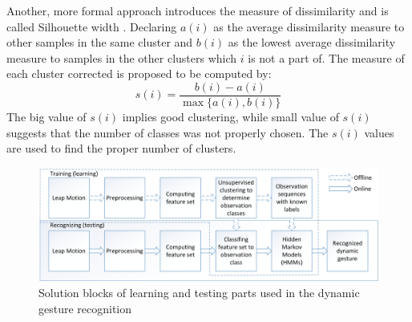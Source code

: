Another, more formal approach introduces the measure of dissimilarity and is called Silhouette width \cite{silhouette}.
Declaring $a(i)$ as the average dissimilarity measure to other samples in the same cluster and $b(i)$ as the lowest average dissimilarity measure to samples in the other clusters which $i$ is not a part of.
The measure of each cluster corrected is proposed to be computed by:
\begin{equation}
s(i) = \frac{b(i) - a(i)}{\max{\{a(i),b(i)}\}}
\end{equation}
The big value of $s(i)$ implies good clustering, while small value of $s(i)$ suggests that the number of classes was not properly chosen.
The $s(i)$ values are used to find the proper number of clusters.


\begin{figure}[htb]
\centering
 \includegraphics[width=1\columnwidth]{figures/DynamicGestures.png}
 \caption{Solution blocks of learning and testing parts used in the dynamic gesture recognition}
 \label{dynamicgesturesflow}
\end{figure}


